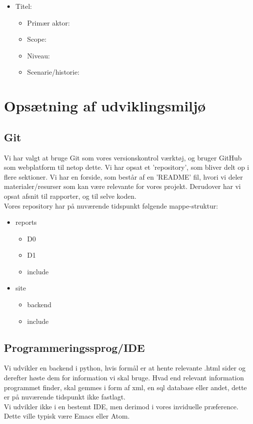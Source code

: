 \documentclass[11pt]{article}
\begin{document}
\begin{itemize}
\item Titel:
  \begin{itemize}
  \item Primær aktor:
  \item Scope:
  \item Niveau:
  \item Scenarie/historie:
  \end{itemize}
\end{itemize}
\section{Opsætning af udviklingsmiljø}
\subsection{Git}
Vi har valgt at bruge Git som vores versionskontrol værktøj, og bruger GitHub som webplatform til netop dette.
Vi har opsat et 'repository', som bliver delt op i flere sektioner. Vi har en forside, som består af en 'README' fil, hvori vi deler materialer/resurser som kan være relevante for vores projekt.
Derudover har vi opsat afsnit til rapporter, og til selve koden. \\
Vores repository har på nuværende tidspunkt følgende mappe-struktur:
\begin{itemize}
\item reports
  \begin{itemize}
  \item D0
  \item D1
  \item include
  \end{itemize}
\item site
  \begin{itemize}
  \item backend
  \item include
  \end{itemize}
\end{itemize}
\subsection{Programmeringssprog/IDE}
Vi udvikler en backend i python, hvis formål er at hente relevante .html sider og derefter høste dem for information vi skal bruge. Hvad end relevant information programmet finder, skal gemmes i form af xml, en sql database eller andet, dette er på nuværende tidspunkt ikke fastlagt. \\
Vi udvikler ikke i en bestemt IDE, men derimod i vores inviduelle præference. Dette ville typisk være Emacs eller Atom.
\end{document}
